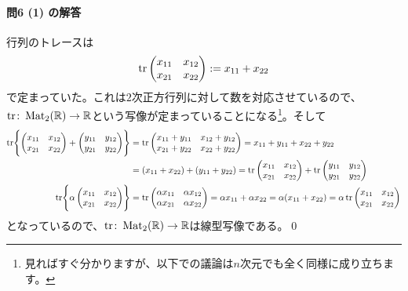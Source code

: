 \paragraph{問6 (1) の解答}
行列のトレースは
\[
\operatorname{tr}
\begin{pmatrix}
x_{11} & x_{12} \\
x_{21} & x_{22}
\end{pmatrix}
:= x_{11} + x_{22}
\]
で定まっていた。これは$2$次正方行列に対して数を対応させているので、$\operatorname{tr}\colon \operatorname{Mat}_2(\mathbb{R}) \rightarrow \mathbb{R}$という写像が定まっていることになる\footnote{見ればすぐ分かりますが、以下での議論は$n$次元でも全く同様に成り立ちます。}。そして
\begin{align*}
\operatorname{tr}
\Biggl\{
\begin{pmatrix}
x_{11} & x_{12} \\
x_{21} & x_{22}
\end{pmatrix}
+
\begin{pmatrix}
y_{11} & y_{12} \\
y_{21} & y_{22}
\end{pmatrix}
\Biggr\}
&=
\operatorname{tr}
\begin{pmatrix}
x_{11} + y_{11} & x_{12} + y_{12} \\
x_{21} + y_{22} & x_{22} + y_{22}
\end{pmatrix} = x_{11} + y_{11} + x_{22} + y_{22} \\
&= (x_{11} + x_{22}) + (y_{11} + y_{22})
= 
\operatorname{tr}
\begin{pmatrix}
x_{11} & x_{12} \\
x_{21} & x_{22}
\end{pmatrix}
+
\operatorname{tr}
\begin{pmatrix}
y_{11} & y_{12} \\
y_{21} & y_{22}
\end{pmatrix} \\
\operatorname{tr}
\Biggl\{
\alpha
\begin{pmatrix}
x_{11} & x_{12} \\
x_{21} & x_{22}
\end{pmatrix}
\Biggr\}
&=
\operatorname{tr}
\begin{pmatrix}
\alpha x_{11} & \alpha x_{12} \\
\alpha x_{21} & \alpha x_{22}
\end{pmatrix}
= \alpha x_{11} + \alpha x_{22} = \alpha (x_{11} + x_{22})
= \alpha
\operatorname{tr}
\begin{pmatrix}
x_{11} & x_{12} \\
x_{21} & x_{22}
\end{pmatrix}
\end{align*}
となっているので、$\operatorname{tr}\colon \operatorname{Mat}_2(\mathbb{R}) \rightarrow \mathbb{R}$は線型写像である。\qed

